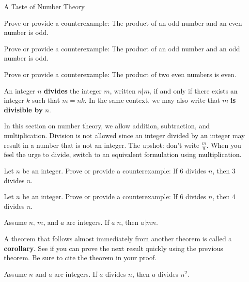 \begin{section}{A Taste of Number Theory}
\begin{problem}
Prove or provide a counterexample: The product of an odd number and an even number is odd.
\end{problem}

\begin{problem}
Prove or provide a counterexample: The product of an odd number and an odd number is odd.
\end{problem}

\begin{problem}
Prove or provide a counterexample: The product of two even numbers is even.
\end{problem}

\begin{definition}
An integer $n$ \textbf{divides} the integer $m$, written $n|m$, if and only if there exists an integer $k$ such that $m=nk$. In the same context, we may also write that $m$ \textbf{is divisible by} $n$.
\end{definition}

In this section on number theory, we allow addition, subtraction, and multiplication.  Division is not allowed since an integer divided by an integer may result in a number that is not an integer. The upshot: don't write $\frac{m}{n}$.  When you feel the urge to divide, switch to an equivalent formulation using multiplication.

\begin{problem}
Let $n$ be an integer.  Prove or provide a counterexample: If 6 divides $n$, then 3 divides $n$.\end{problem}

\begin{problem}
Let $n$ be an integer.  Prove or provide a counterexample: If 6 divides $n$, then 4 divides $n$.
\end{problem}

\begin{theorem}
Assume $n$, $m$, and $a$ are integers.  If $a|n$, then $a|mn$.
\end{theorem}

A theorem that follows almost immediately from another theorem is called a \textbf{corollary}.  See if you can prove the next result quickly using the previous theorem.  Be sure to cite the theorem in your proof.

\begin{corollary}
Assume $n$ and $a$ are integers.  If $a$ divides $n$, then $a$ divides $n^2$.
\end{corollary}


\end{section}
